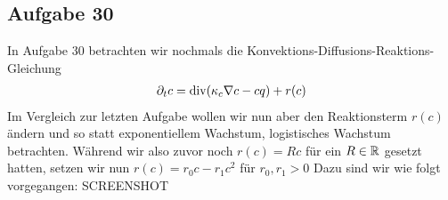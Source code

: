 \subsection{Aufgabe 30}
In Aufgabe 30 betrachten wir nochmals die Konvektions-Diffusions-Reaktions-Gleichung 
\begin{align*}
	\partial_t c = \operatorname{div} ( \kappa_c \nabla c - cq) + r(c)
\end{align*}
Im Vergleich zur letzten Aufgabe wollen wir nun aber den Reaktionsterm $r(c)$ ändern und so statt exponentiellem Wachstum, logistisches Wachstum betrachten. Während wir also zuvor noch $r(c) = Rc$ für ein $R \in \mathbb{R}$ gesetzt hatten, setzen wir nun $r(c) = r_0 c - r_1 c^2$ für $r_0,r_1 > 0$
\newline
Dazu sind wir wie folgt vorgegangen:
SCREENSHOT
